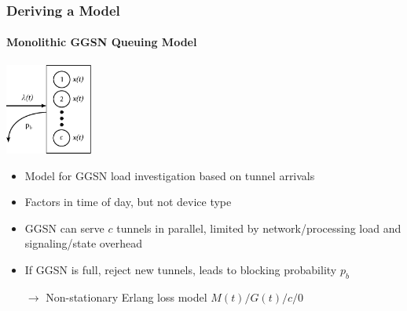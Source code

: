 \documentclass{beamer}
\begin{document}


\begin{frame}
	\frametitle{Deriving a Model}
	\framesubtitle{Monolithic GGSN Queuing Model}
		\begin{center}
			\includegraphics[height=3cm]{../../chapters/041-mobilenetsmeasuring/images/ggsn-monolithic.pdf}
		\end{center}

		\begin{itemize}
			\item Model for GGSN load investigation based on tunnel arrivals
			\item Factors in time of day, but not device type
			\item GGSN can serve $c$ tunnels in parallel, limited by network/processing load and signaling/state overhead
			\item If GGSN is full, reject new tunnels, leads to blocking probability $p_b$
			\item[$\rightarrow$] Non-stationary Erlang loss model $M(t)/G(t)/c/0$ 
		\end{itemize}

\end{frame}
\end{document}
